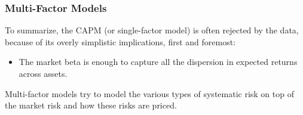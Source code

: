 \documentclass[xcolor=dvipsnames, english, 8pt]{beamer}
\begin{document}




\begin{frame}
    \frametitle{Multi-Factor Models}

    To summarize, the CAPM (or single-factor model) is often rejected by the data, because of its overly
    simplistic implications, first and foremost:\vspace{0.25cm}\\
    \begin{itemize}
        \item The market beta is enough to capture all the dispersion in expected returns across assets.\vspace{0.25cm}
    \end{itemize}

    Multi-factor models try to model the various types of systematic risk on top of the market risk and how these
    risks are priced.

\end{frame}
\end{document}
